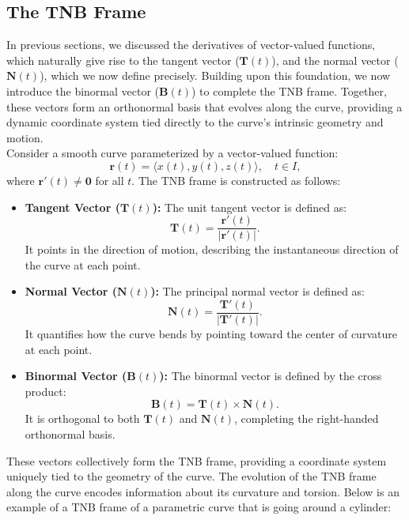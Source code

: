 \subsection*{The TNB Frame}

\noindent In previous sections, we discussed the derivatives of vector-valued functions, which naturally give rise to the tangent vector (\( \mathbf{T}(t) \)), and the normal vector (\( \mathbf{N}(t) \)), which we now define precisely. Building upon this foundation, we now introduce the binormal vector (\( \mathbf{B}(t) \)) to complete the TNB frame. Together, these vectors form an orthonormal basis that evolves along the curve, providing a dynamic coordinate system tied directly to the curve’s intrinsic geometry and motion. \\

\noindent Consider a smooth curve parameterized by a vector-valued function:
\[
\mathbf{r}(t) = \langle x(t), y(t), z(t) \rangle, \quad t \in I,
\]
where \( \mathbf{r}'(t) \neq \mathbf{0} \) for all \( t \). The TNB frame is constructed as follows:
\begin{itemize}
    \item \textbf{Tangent Vector (\( \mathbf{T}(t) \)):} The unit tangent vector is defined as:
    \[
    \mathbf{T}(t) = \frac{\mathbf{r}'(t)}{|\mathbf{r}'(t)|}.
    \]
    It points in the direction of motion, describing the instantaneous direction of the curve at each point.
    \item \textbf{Normal Vector (\( \mathbf{N}(t) \)):} The principal normal vector is defined as:
    \[
    \mathbf{N}(t) = \frac{\mathbf{T}'(t)}{|\mathbf{T}'(t)|}.
    \]
    It quantifies how the curve bends by pointing toward the center of curvature at each point.
    \item \textbf{Binormal Vector (\( \mathbf{B}(t) \)):} The binormal vector is defined by the cross product:
    \[
    \mathbf{B}(t) = \mathbf{T}(t) \times \mathbf{N}(t).
    \]
    It is orthogonal to both \( \mathbf{T}(t) \) and \( \mathbf{N}(t) \), completing the right-handed orthonormal basis.
\end{itemize}

\noindent These vectors collectively form the TNB frame, providing a coordinate system uniquely tied to the geometry of the curve. The evolution of the TNB frame along the curve encodes information about its curvature and torsion. Below is an example of a TNB frame of a parametric curve that is going around a cylinder:

